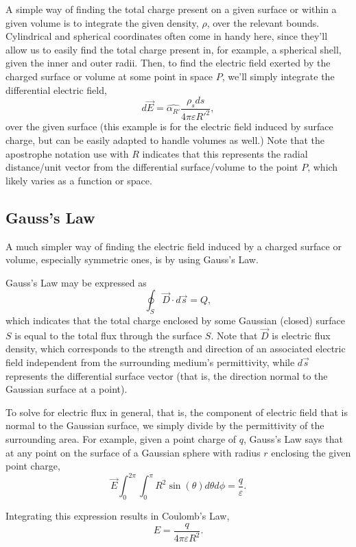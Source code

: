 \documentclass{article}
\begin{document}
A simple way of finding the total charge present on a given surface or within a given volume is to integrate the given density, \(\rho\), over the relevant bounds. Cylindrical and spherical coordinates often come in handy here, since they'll allow us to easily find the total charge present in, for example, a spherical shell, given the inner and outer radii. Then, to find the electric field exerted by the charged surface or volume at some point in space \(P\), we'll simply integrate the differential electric field, \[d \vec{E} = \hat{\alpha_{R'}}\frac{\rho_s ds}{4\pi\varepsilon R'^2},\] over the given surface (this example is for the electric field induced by surface charge, but can be easily adapted to handle volumes as well.) Note that the apostrophe notation use with \(R\) indicates that this represents the radial distance/unit vector from the differential surface/volume to the point \(P\), which likely varies as a function or space.

\setcounter{subsection}{3}
\subsection{Gauss's Law}

A much simpler way of finding the electric field induced by a charged surface or volume, especially symmetric ones, is by using Gauss's Law. 

Gauss's Law may be expressed as 
\[
	\oint_{S}\vec{D}\cdot d \vec{s} = Q,
\]
which indicates that the total charge enclosed by some Gaussian (closed) surface \(S\) is equal to the total flux through the surface \(S\). Note that \(\vec{D}\) is electric flux density, which corresponds to the strength and direction of an associated electric field independent from the surrounding medium's permittivity, while \(d \vec{s}\) represents the differential surface vector (that is, the direction normal to the Gaussian surface at a point). 

To solve for electric flux in general, that is, the component of electric field that is normal to the Gaussian surface, we simply divide by the permittivity of the surrounding area. For example, given a point charge of \(q\), Gauss's Law says that at any point on the surface of a Gaussian sphere with radius \(r\) enclosing the given point charge, 
\[
	\vec{E} \int_{0}^{2\pi} \int_{0}^{\pi} R^2 \sin{(\theta)} d \theta d \phi = \frac{q}{\varepsilon}.
\]

Integrating this expression results in Coulomb's Law, 
\[
  E = \frac{q}{4 \pi \varepsilon R^2}.
\]
\end{document}
